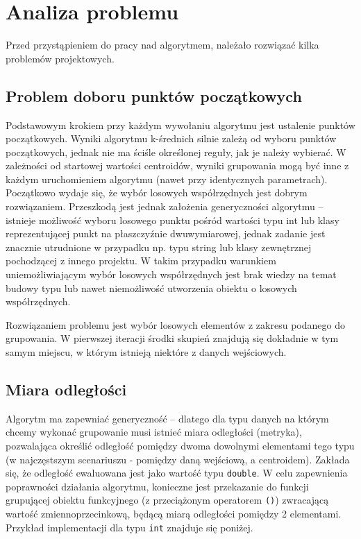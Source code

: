 \section{Analiza problemu}

Przed przystąpieniem do pracy nad algorytmem, należało rozwiązać kilka problemów projektowych.

\subsection{Problem doboru punktów początkowych}

Podstawowym krokiem przy każdym wywołaniu algorytmu jest ustalenie punktów początkowych. Wyniki algorytmu k-średnich silnie zależą od wyboru punktów początkowych, jednak nie ma ściśle określonej reguły, jak je należy wybierać. W zależności od startowej wartości centroidów, wyniki grupowania mogą być inne z każdym uruchomieniem algorytmu (nawet przy identycznych parametrach). Początkowo wydaje się, że wybór losowych współrzędnych jest dobrym rozwiązaniem. Przeszkodą jest jednak założenia generyczności algorytmu -- istnieje możliwość wyboru losowego punktu pośród wartości typu int lub klasy reprezentującej punkt na płaszczyźnie dwuwymiarowej, jednak zadanie jest znacznie utrudnione w przypadku np. typu string lub klasy zewnętrznej pochodzącej z innego projektu. W takim przypadku warunkiem uniemożliwiającym wybór losowych współrzędnych jest brak wiedzy na temat budowy typu lub nawet niemożliwość utworzenia obiektu o losowych współrzędnych.

Rozwiązaniem problemu jest wybór losowych elementów z zakresu podanego do grupowania. W pierwszej iteracji środki skupień znajdują się dokładnie w tym samym miejscu, w którym istnieją niektóre z danych wejściowych.

\subsection{Miara odległości}\label{metric}

Algorytm ma zapewniać generyczność -- dlatego dla typu danych na którym chcemy wykonać grupowanie musi istnieć miara odległości (metryka), pozwalająca określić odległość pomiędzy dwoma dowolnymi elementami tego typu (w najczęstszym scenariuszu - pomiędzy daną wejściową, a centroidem). Zakłada się, że odległość ewaluowana jest jako wartość typu \texttt{double}. W celu zapewnienia poprawności działania algorytmu, konieczne jest przekazanie do funkcji grupującej obiektu funkcyjnego (z przeciążonym operatorem \texttt{()}) zwracającą wartość zmiennoprzecinkową, będącą miarą odległości pomiędzy 2 elementami. Przykład implementacji dla typu \texttt{int} znajduje się poniżej.

